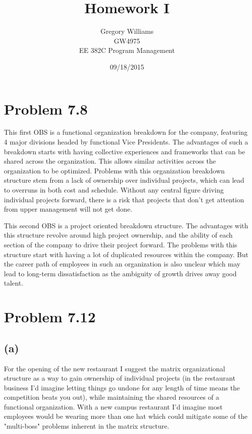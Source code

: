 \documentclass{article}
\title{Homework I}
\author{Gregory Williams\\GW4975\\EE 382C Program Management}
\date{09/18/2015}
\begin{document}
	\maketitle
	\section*{Problem 7.8}
	
	This first OBS is a functional organization breakdown for the company, featuring 4 major divisions headed by functional Vice Presidents.
	The advantages of such a breakdown starts with having collective experiences and frameworks that can be shared across the organization.  This allows similar activities across the organization to be optimized. Problems with this 	organization breakdown structure stem from a lack of ownership over individual projects, which can lead to overruns in both cost and schedule. Without any central figure driving individual projects forward, there is a risk that 		projects that don't get attention from upper management will not get done.

	\begin{center}
		
	\end{center}
	
	This second OBS is a project oriented breakdown structure. The advantages with this structure revolve around high project ownership, and the ability of each section of the company to drive their project forward. The problems with 	this structure start with having a lot of duplicated resources within the company. But the career path of employees in such an organization is also unclear which may lead to long-term dissatisfaction as the ambiguity of growth 		drives away good talent.
	
	\begin{center}
		
	\end{center}
	
	
	\section*{Problem 7.12}
	\subsection*{\quad(a)}
	For the opening of the new restaurant I suggest the matrix organizational structure as a way to gain ownership of individual projects (in the restaurant business I'd imagine letting things go undone for any length of time means the 	competition beats you out), while maintaining the shared resources of a functional organization. With a new campus restaurant I'd imagine most employees would be wearing more than one hat which could mitigate some of the 		"multi-boss" problems inherent in the matrix structure.
	
\end{document}
